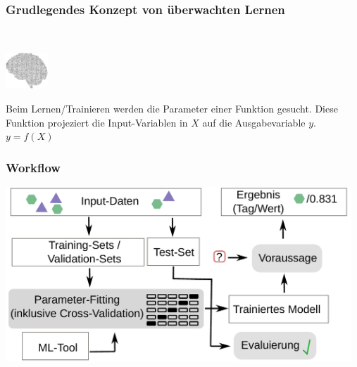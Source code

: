 \documentclass[aspectratio=169]{beamer}
\begin{document}
\begin{frame}
  \frametitle{Grudlegendes Konzept von überwachten Lernen}
  \begin{block}{}
    \vspace{0.5cm}
    \ \ \ \
    \begin{minipage}{0.15\textwidth}
      \includegraphics[width=1.6cm]{images/publicdomainvectors_Random-Alphabet-Brain.pdf}
    \end{minipage}
    \hfill
    \begin{minipage}{0.75\textwidth}
      Beim Lernen/Trainieren werden die Parameter einer Funktion
      gesucht. Diese Funktion projeziert die Input-Variablen in $X$
      auf die Ausgabevariable $y$.\\

      $y = f(X)$
    \end{minipage}
    \vspace{0.3cm}
  \end{block}
\end{frame}

\begin{frame}
  \frametitle{Workflow}
  \begin{center}
    \includegraphics[width=13cm]{images/workflow_training_test_set.pdf}
  \end{center}  
\end{frame}
\end{document}

